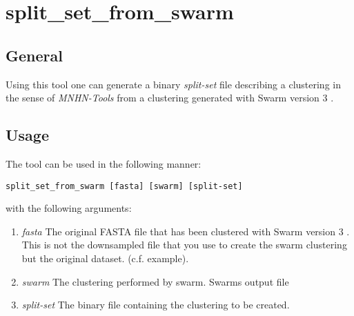 \section{split\_set\_from\_swarm} \label{sec-ssswarm}

\subsection{General}

Using this tool one can generate a binary \emph{split-set} file describing
a clustering in the sense of \emph{MNHN-Tools} from a clustering generated
with Swarm version 3 \cite{swarm2}.

\subsection{Usage}
The tool can be used in the following manner:
\begin{lstlisting}
split_set_from_swarm [fasta] [swarm] [split-set]
\end{lstlisting}
with the following arguments:
\begin{enumerate}
  \item \emph{fasta} The original FASTA file that has been clustered with Swarm
    version 3 \cite{swarm2}. This is not the downsampled file that you
    use to create the swarm clustering but the original
    dataset. (c.f. example).
  \item \emph{swarm} The clustering performed by swarm. Swarms output
    file
  \item \emph{split-set} The binary file containing the clustering to
    be created.
\end{enumerate}

